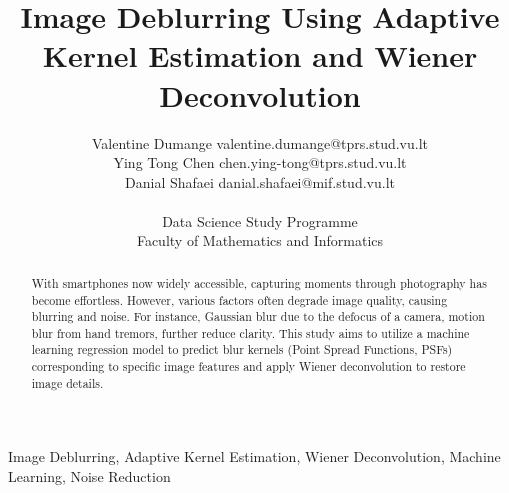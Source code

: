 \documentclass[twoside,11pt]{article}
\begin{document}
\title{Image Deblurring Using Adaptive Kernel Estimation and Wiener Deconvolution}

\author{\name Valentine Dumange \email valentine.dumange@tprs.stud.vu.lt \\
\AND
    \name Ying Tong Chen \email chen.ying-tong@tprs.stud.vu.lt\\
\AND
    \name Danial Shafaei \email danial.shafaei@mif.stud.vu.lt \\\\
       \addr Data Science Study Programme\\
       Faculty of Mathematics and Informatics}


\maketitle

\begin{abstract}
With smartphones now widely accessible, capturing moments through photography has become effortless. However, various factors often degrade image quality, causing blurring and noise. For instance, Gaussian blur due to the defocus of a camera, motion blur from hand tremors, further reduce clarity. This study aims to utilize a machine learning regression model to predict blur kernels (Point Spread Functions, PSFs) corresponding to specific image features and apply Wiener deconvolution to restore image details.
\end{abstract}

\begin{keywords}
  Image Deblurring, Adaptive Kernel Estimation, Wiener Deconvolution, Machine Learning, Noise Reduction
\end{keywords}
\end{document}

